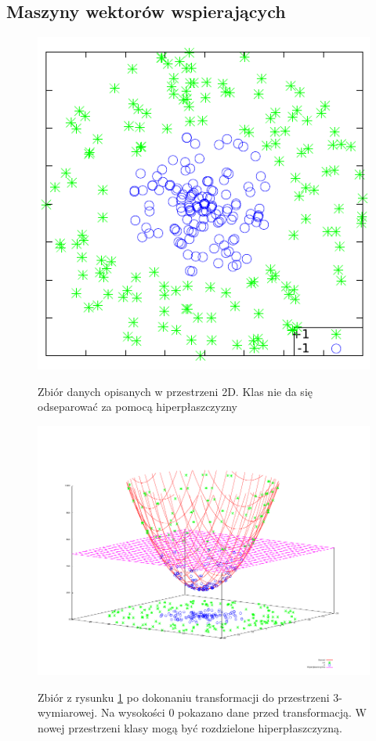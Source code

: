 \subsection{Maszyny wektorów wspierających}


\begin{figure}[h]
\centering
\includegraphics[scale=1]{figures/functions/2-nonlinear}
\label{fig:nonlinear}
\caption{Zbiór danych opisanych w przestrzeni 2D. Klas nie da się odseparować za pomocą hiperpłaszczyzny}
\end{figure}

\begin{figure}[h]
\centering
\includegraphics[scale=0.8]{figures/functions/2-transform}
\label{fig:transform}
\caption{Zbiór z rysunku \ref{fig:nonlinear} po dokonaniu transformacji do przestrzeni 3-wymiarowej. Na wysokości 0 pokazano dane przed transformacją. W nowej przestrzeni klasy mogą być rozdzielone hiperpłaszczyzną.}
\end{figure}

